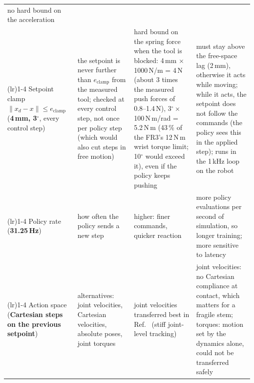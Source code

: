 \begin{center}
{\begin{tabular}{>{\raggedright\arraybackslash}p{}>{\raggedright\arraybackslash}p{}>{\raggedright\arraybackslash}p{}>{\raggedright\arraybackslash}p{}}
      no hard bound on the acceleration \\
  \addlinespace\cmidrule(lr){1-4}\addlinespace
  Setpoint clamp \newline $\lVert x_d - x\rVert \le e_\text{clamp}$ \newline (\textbf{4\,mm, 3$^\circ$}, every control
    step)
    & the setpoint is never further than $e_\text{clamp}$ from the measured tool; checked at every control step, not
      once per policy step (which would also cut steps in free motion)
    & hard bound on the spring force when the tool is blocked: 4\,mm $\times$ 1000\,N/m = 4\,N (about 3 times the
      measured push forces of 0.8--1.4\,N), 3$^\circ \times$ 100\,N\,m/rad = 5.2\,N\,m (43\,\% of the FR3's 12\,N\,m
      wrist torque limit; 10$^\circ$ would exceed it), even if the policy keeps pushing
    & must stay above the free-space lag (2\,mm), otherwise it acts while moving; while it acts, the setpoint does not
      follow the commands (the policy sees this in the applied step); runs in the 1\,kHz loop on the robot \\
  \addlinespace\cmidrule(lr){1-4}\addlinespace
  Policy rate \newline (\textbf{31.25\,Hz})
    & how often the policy sends a new step
    & higher: finer commands, quicker reaction
    & more policy evaluations per second of simulation, so longer training; more sensitive to latency \\
  \addlinespace\cmidrule(lr){1-4}\addlinespace
  Action space \newline (\textbf{Cartesian steps on the previous setpoint})
    & alternatives: joint velocities, Cartesian velocities, absolute poses, joint torques
    & joint velocities transferred best in Ref.~\cite{al-aljalbout2024} (stiff joint-level tracking)
    & joint velocities: no Cartesian compliance at contact, which matters for a fragile stem; torques: motion set by
      the dynamics alone, could not be transferred safely~\cite{al-aljalbout2024} \\
  \bottomrule
\end{tabular}}
\end{center}

\clearpage
